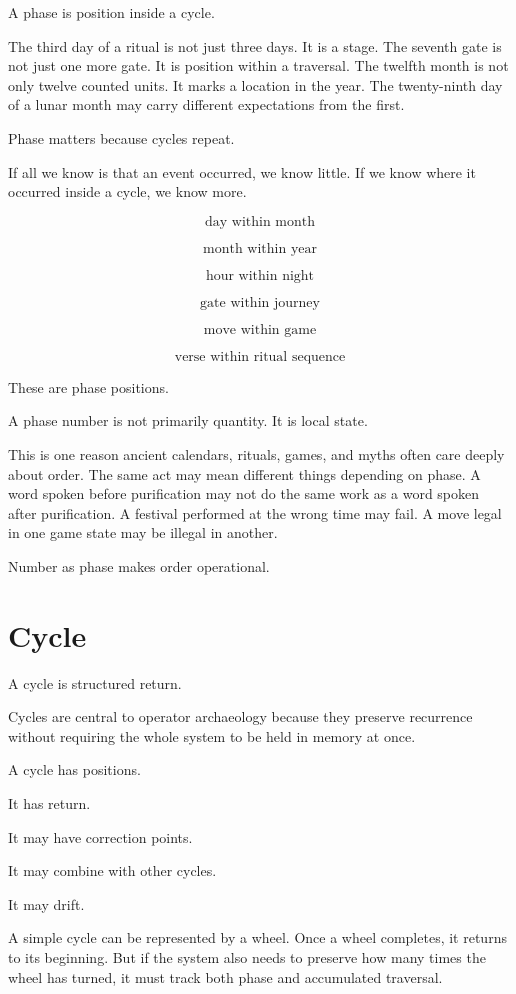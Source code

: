 \documentclass[11pt]{book}
\begin{document}
A phase is position inside a cycle.

The third day of a ritual is not just three days. It is a stage. The seventh gate is not just one more gate. It is position within a traversal. The twelfth month is not only twelve counted units. It marks a location in the year. The twenty-ninth day of a lunar month may carry different expectations from the first.

Phase matters because cycles repeat.

If all we know is that an event occurred, we know little. If we know where it occurred inside a cycle, we know more.

\[
\text{day within month}
\]

\[
\text{month within year}
\]

\[
\text{hour within night}
\]

\[
\text{gate within journey}
\]

\[
\text{move within game}
\]

\[
\text{verse within ritual sequence}
\]

These are phase positions.

A phase number is not primarily quantity. It is local state.

This is one reason ancient calendars, rituals, games, and myths often care deeply about order. The same act may mean different things depending on phase. A word spoken before purification may not do the same work as a word spoken after purification. A festival performed at the wrong time may fail. A move legal in one game state may be illegal in another.

Number as phase makes order operational.

\section{Cycle}

A cycle is structured return.

Cycles are central to operator archaeology because they preserve recurrence without requiring the whole system to be held in memory at once.

A cycle has positions.

It has return.

It may have correction points.

It may combine with other cycles.

It may drift.

A simple cycle can be represented by a wheel. Once a wheel completes, it returns to its beginning. But if the system also needs to preserve how many times the wheel has turned, it must track both phase and accumulated traversal.
\end{document}
